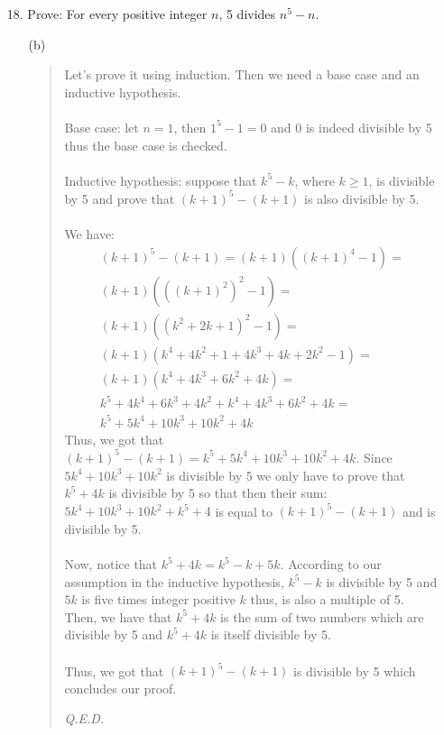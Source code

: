 \documentclass[12pt, a4paper]{article}                      %
\begin{document}
\begin{itemize}
\item[18.]
Prove: For every positive integer $n$, 5 divides $n^5 - n$.
\begin{itemize}
\item[(b)]
\begin{quote}
Let's prove it using induction. Then we need a base case and an inductive hypothesis.\\\\
Base case: let $n = 1$, then $1^5 - 1 = 0$ and 0 is indeed divisible by 5 thus the base case is checked.\\\\
Inductive hypothesis: suppose that $k^5 - k$, where $k \geq 1$, is divisible by 5 and prove that $(k + 1)^5 - (k + 1)$
is also divisible by 5.\\\\
We have:
\begin{align*}
(k + 1)^5 - (k + 1) = (k + 1)((k + 1)^4 - 1) =\\
(k + 1)(((k + 1)^2)^2 - 1) =\\
(k + 1)((k^2 + 2k + 1)^2 - 1) =\\
(k + 1)(k^4 + 4k^2 + 1 + 4k^3 + 4k + 2k^2 - 1) =\\
(k + 1)(k^4 + 4k^3 + 6k^2 + 4k) =\\
k^5 + 4k^4 + 6k^3 + 4k^2 + k^4 + 4k^3 + 6k^2 + 4k =\\
k^5 + 5k^4 + 10k^3 + 10k^2 + 4k
\end{align*}
Thus, we got that $(k + 1)^5 - (k + 1) = k^5 + 5k^4 + 10k^3 + 10k^2 + 4k$. Since $5k^4 + 10k^3 + 10k^2$
is divisible by 5 we only have to prove that $k^5 + 4k$ is divisible by 5 so that then their sum: $5k^4 + 10k^3 + 10k^2 + k^5 + 4$
is equal to $(k + 1)^5 - (k + 1)$ and is divisible by 5.\\\\
Now, notice that $k^5 + 4k = k^5 - k + 5k$. According to our assumption in the inductive hypothesis, $k^5 - k$ is divisible
by 5 and $5k$ is five times integer positive $k$ thus, is also a multiple of 5. Then, we have that $k^5 + 4k$ is the sum of
two numbers which are divisible by 5 and $k^5 + 4k$ is itself divisible by 5.\\\\
Thus, we got that $(k + 1)^5 - (k + 1)$ is divisible by 5 which concludes our proof.
\begin{flushright}
\textit{Q.E.D.}
\end{flushright}
\end{quote}
\end{itemize}
\end{itemize}
\end{document}
